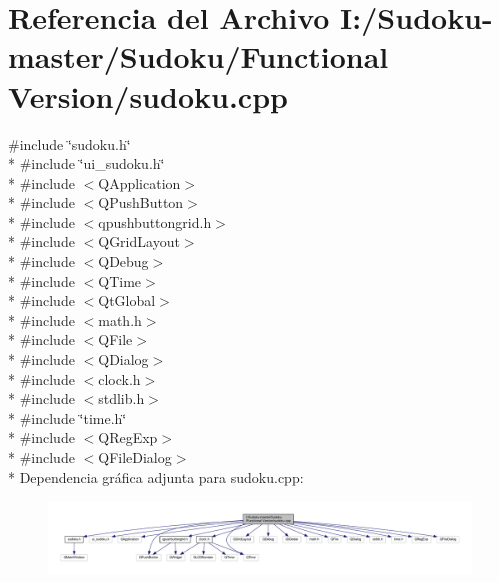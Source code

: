 \section{Referencia del Archivo I\-:/\-Sudoku-\/master/\-Sudoku/\-Functional Version/sudoku.cpp}
\label{sudoku_8cpp}
{\ttfamily \#include \char`\"{}sudoku.\-h\char`\"{}}\\*
{\ttfamily \#include \char`\"{}ui\-\_\-sudoku.\-h\char`\"{}}\\*
{\ttfamily \#include $<$Q\-Application$>$}\\*
{\ttfamily \#include $<$Q\-Push\-Button$>$}\\*
{\ttfamily \#include $<$qpushbuttongrid.\-h$>$}\\*
{\ttfamily \#include $<$Q\-Grid\-Layout$>$}\\*
{\ttfamily \#include $<$Q\-Debug$>$}\\*
{\ttfamily \#include $<$Q\-Time$>$}\\*
{\ttfamily \#include $<$Qt\-Global$>$}\\*
{\ttfamily \#include $<$math.\-h$>$}\\*
{\ttfamily \#include $<$Q\-File$>$}\\*
{\ttfamily \#include $<$Q\-Dialog$>$}\\*
{\ttfamily \#include $<$clock.\-h$>$}\\*
{\ttfamily \#include $<$stdlib.\-h$>$}\\*
{\ttfamily \#include \char`\"{}time.\-h\char`\"{}}\\*
{\ttfamily \#include $<$Q\-Reg\-Exp$>$}\\*
{\ttfamily \#include $<$Q\-File\-Dialog$>$}\\*
Dependencia gráfica adjunta para sudoku.\-cpp\-:
\nopagebreak
\begin{figure}[H]
\begin{center}
\leavevmode
\includegraphics[width=350pt]{sudoku_8cpp__incl}
\end{center}
\end{figure}

